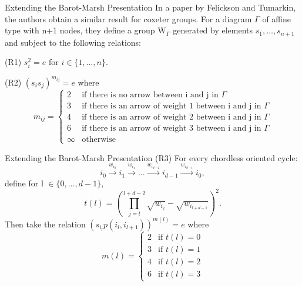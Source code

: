 \documentclass{beamer}
\begin{document}
\begin{frame}{Extending the Barot-Marsh Presentation}
In a paper by Felickson and Tumarkin, the authors obtain a similar result for coxeter groups. For a diagram $\Gamma$ of affine type with n+1 nodes, they define a group W$_{\Gamma}$ generated by elements $s_{1}, \dots, s_{n+1}$ and subject to the following relations:

(R1) $s_{i}^{2} = e$ for $i \in \{1, \dots, n\}$.

(R2) $(s_{i}s_{j})^{m_{ij}} = e$ where 
$$m_{ij} = 
\begin{cases}
2 &\text{if there is no arrow between i and j in $\Gamma$} \\
3 &\text{if there is an arrow of weight 1 between i and j in $\Gamma$} \\
4 &\text{if there is an arrow of weight 2 between i and j in $\Gamma$} \\
6 &\text{if there is an arrow of weight 3 between i and j in $\Gamma$} \\
\infty &\text{otherwise}
\end{cases}$$
\end{frame}

\begin{frame}{Extending the Barot-Marsh Presentation}
(R3) For every chordless oriented cycle:
$$i_{0} \stackrel{w_{i_{0}}}{\longrightarrow} i_{1} \stackrel{w_{i_{1}}}{\longrightarrow} \dots \stackrel{w_{i_{d-2}}}{\longrightarrow} i_{d-1} \stackrel{w_{i_{d-1}}}{\longrightarrow} i_{0},$$
define for l $\in \{0, \dots, d-1\}$, 
$$t(l) = (\prod_{j=l}^{l+d-2}{\sqrt{w_{i_{j}}}} - \sqrt{w_{i_{l+d-1}}})^{2}.$$
Then take the relation $(s_{i_{l}}p(i_{l}, i_{l+1}))^{m(l)} = e$ where
$$m(l) =
\begin{cases}
2 &\text{if $t(l)=0$} \\
3 &\text{if $t(l)=1$} \\
4 &\text{if $t(l)=2$} \\
6 &\text{if $t(l)=3$}
\end{cases}$$
\end{frame}
\end{document}
